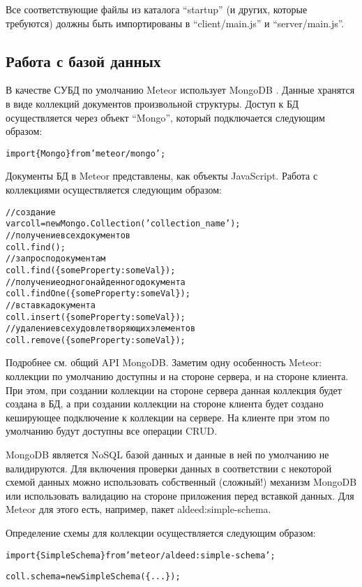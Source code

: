 \documentclass[a4paper,12pt]{article}
\begin{document}
Все соответствующие файлы из каталога ``startup'' (и
других, которые требуются) должны быть
импортированы в ``client/main.js'' и ``server/main.js''.

\subsection{Работа с базой данных}
В качестве СУБД по умолчанию Meteor использует MongoDB \cite{X}. 
Данные хранятся в виде коллекций документов произвольной структуры.
Доступ к БД осуществляется через объект ``Mongo'', который подключается
следующим образом:

\begin{alltt}
import \{ Mongo \} from 'meteor/mongo';
\end{alltt}

Документы БД в Meteor представлены, как объекты JavaScript.
Работа с коллекциями осуществляется следующим образом:

\begin{alltt}
// создание
var coll = new Mongo.Collection('collection\_name'); 
// получение всех документов
coll.find();
// запрос по документам
coll.find(\{someProperty: someVal\});
// получение одного найденного документа
coll.findOne(\{someProperty: someVal\});
// вставка документа
coll.insert(\{someProperty: someVal\});
// удаление всех удовлетворяющих элементов
coll.remove(\{someProperty: someVal\});
\end{alltt}

Подробнее см. общий API MongoDB. Заметим одну особенность Meteor:
коллекции по умолчанию доступны и на стороне сервера, и на стороне
клиента. При этом, при создании коллекции на стороне сервера
данная коллекция будет создана в БД, а при создании
коллекции на стороне клиента будет создано кеширующее подключение
к коллекции на сервере. На клиенте при этом по умолчанию будут
доступны все операции CRUD.

MongoDB является NoSQL базой данных и данные в ней по умолчанию
не валидируются. Для включения проверки данных в соответствии
с некоторой схемой данных можно использовать собственный (сложный!)
механизм MongoDB или использовать валидацию на стороне приложения
перед вставкой данных. Для Meteor для этого есть, например, пакет
aldeed:simple-schema.

Определение схемы для коллекции осуществляется следующим образом:
\begin{alltt}
	import \{ SimpleSchema \} from 'meteor/aldeed:simple-schema';
	
	coll.schema = new SimpleSchema(\{...\});
\end{alltt}
\end{document}
